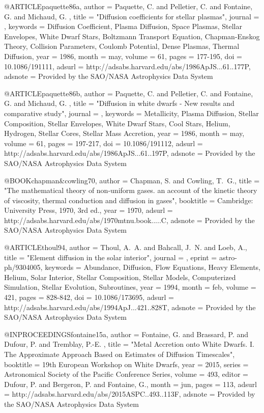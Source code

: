 \documentclass[a4paper,fleqn,usenatbib]{mnras}
\begin{document}
{{{@ARTICLE{paquette86a,
   author = {{Paquette}, C. and {Pelletier}, C. and {Fontaine}, G. and {Michaud}, G.
	},
    title = "{Diffusion coefficients for stellar plasmas}",
  journal = {\apjs},
 keywords = {Diffusion Coefficient, Plasma Diffusion, Space Plasmas, Stellar Envelopes, White Dwarf Stars, Boltzmann Transport Equation, Chapman-Enskog Theory, Collision Parameters, Coulomb Potential, Dense Plasmas, Thermal Diffusion},
     year = 1986,
    month = may,
   volume = 61,
    pages = {177-195},
      doi = {10.1086/191111},
   adsurl = {http://adsabs.harvard.edu/abs/1986ApJS...61..177P},
  adsnote = {Provided by the SAO/NASA Astrophysics Data System}
}

@ARTICLE{paquette86b,
   author = {{Paquette}, C. and {Pelletier}, C. and {Fontaine}, G. and {Michaud}, G.
	},
    title = "{Diffusion in white dwarfs - New results and comparative study}",
  journal = {\apjs},
 keywords = {Metallicity, Plasma Diffusion, Stellar Composition, Stellar Envelopes, White Dwarf Stars, Cool Stars, Helium, Hydrogen, Stellar Cores, Stellar Mass Accretion},
     year = 1986,
    month = may,
   volume = 61,
    pages = {197-217},
      doi = {10.1086/191112},
   adsurl = {http://adsabs.harvard.edu/abs/1986ApJS...61..197P},
  adsnote = {Provided by the SAO/NASA Astrophysics Data System}
}


@BOOK{chapman&cowling70,
   author = {{Chapman}, S. and {Cowling}, T.~G.},
    title = "{The mathematical theory of non-uniform gases. an account of the kinetic theory of viscosity, thermal conduction and diffusion in gases}",
booktitle = {Cambridge: University Press, 1970, 3rd ed.},
     year = 1970,
   adsurl = {http://adsabs.harvard.edu/abs/1970mtnu.book.....C},
  adsnote = {Provided by the SAO/NASA Astrophysics Data System}
}

@ARTICLE{thoul94,
   author = {{Thoul}, A.~A. and {Bahcall}, J.~N. and {Loeb}, A.},
    title = "{Element diffusion in the solar interior}",
  journal = {\apj},
   eprint = {astro-ph/9304005},
 keywords = {Abundance, Diffusion, Flow Equations, Heavy Elements, Helium, Solar Interior, Stellar Composition, Stellar Models, Computerized Simulation, Stellar Evolution, Subroutines},
     year = 1994,
    month = feb,
   volume = 421,
    pages = {828-842},
      doi = {10.1086/173695},
   adsurl = {http://adsabs.harvard.edu/abs/1994ApJ...421..828T},
  adsnote = {Provided by the SAO/NASA Astrophysics Data System}
}



@INPROCEEDINGS{fontaine15a,
   author = {{Fontaine}, G. and {Brassard}, P. and {Dufour}, P. and {Tremblay}, P.-E.
	},
    title = "{Metal Accretion onto White Dwarfs. I. The Approximate Approach Based on Estimates of Diffusion Timescales}",
booktitle = {19th European Workshop on White Dwarfs},
     year = 2015,
   series = {Astronomical Society of the Pacific Conference Series},
   volume = 493,
   editor = {{Dufour}, P. and {Bergeron}, P. and {Fontaine}, G.},
    month = jun,
    pages = {113},
   adsurl = {http://adsabs.harvard.edu/abs/2015ASPC..493..113F},
  adsnote = {Provided by the SAO/NASA Astrophysics Data System}
}

}}}
\end{document}
